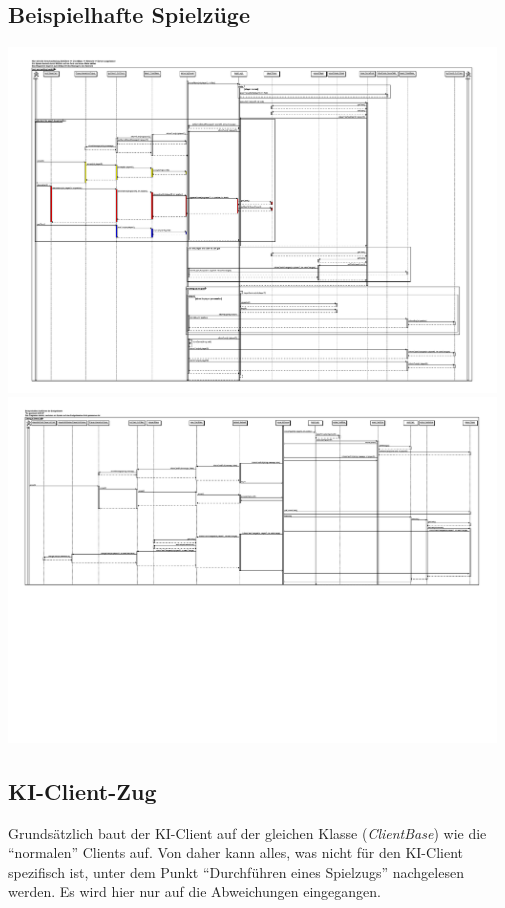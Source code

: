 \documentclass[a4paper,10pt]{article}
\begin{document}
\subsection{Beispielhafte Spielzüge}
\includegraphics[width=0.97\textwidth]{bankrott_gehen}
\includegraphics[width=0.97\textwidth]{Ereigniskarte}


\subsection{KI-Client-Zug}
Grundsätzlich baut der KI-Client auf der gleichen Klasse (\textit{ClientBase}) wie die "`normalen"' Clients auf. Von daher kann alles, was nicht für den KI-Client spezifisch ist, unter dem Punkt "`Durchführen eines Spielzugs"' nachgelesen werden. Es wird hier nur auf die Abweichungen eingegangen.
\end{document}
